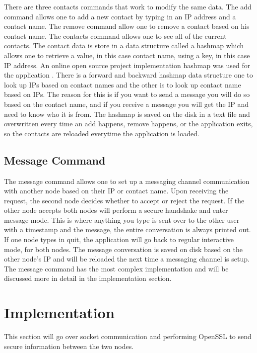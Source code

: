 \documentclass[twoside]{article}
\begin{document}
\begin{multicols}{2}
There are three contacts commands that work to modify the same data. The add command allows one to add a new contact by typing in an IP address and a contact name. The remove command allow one to remove a contact based on his contact name. The contacts command allows one to see all of the current contacts. The contact data is store in a data structure called a hashmap which allows one to retrieve a value, in this case contact name, using a key, in this case IP address. An online open source project implementation hashmap was used for the application \cite{petewarden}. There is a forward and backward hashmap data structure one to look up IPs based on contact names and the other is to look up contact name based on IPs. The reason for this is if you want to send a message you will do so based on the contact name, and if you receive a message you will get the IP and need to know who it is from. The hashmap is saved on the disk in a text file and overwritten every time an add happens, remove happens, or the application exits, so the contacts are reloaded everytime the application is loaded. 

\subsection{Message Command}

The message command allows one to set up a messaging channel communication with another node based on their IP or contact name. Upon receiving the request, the second node decides whether to accept or reject the request. If the other node accepts both nodes will perform a secure handshake and enter message mode. This is where anything you type is sent over to the other user with a timestamp and the message, the entire conversation is always printed out. If one node types in quit, the application will go back to regular interactive mode, for both nodes. 
The message conversation is saved on disk based on the other node's IP and will be reloaded the next time a messaging channel is setup. 
The message command has the most complex implementation and will be discussed more in detail in the implementation section. 


\section{Implementation}
This section will go over socket communication and performing OpenSSL to send secure information between the two nodes. 

\end{multicols}
\end{document}
